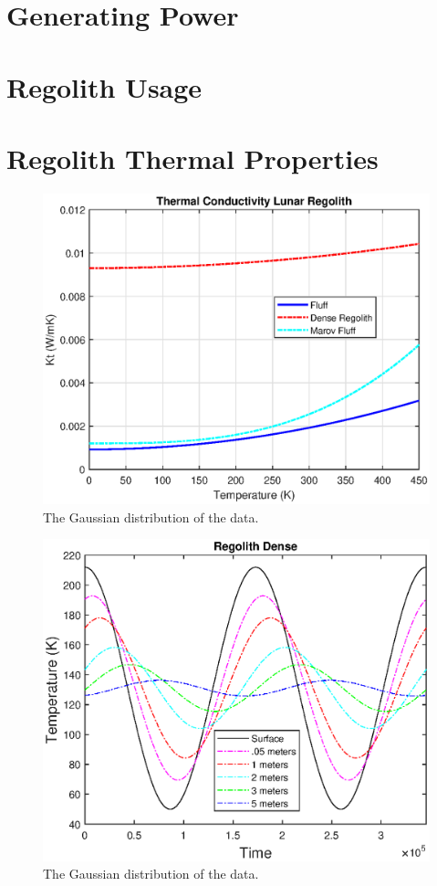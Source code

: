 \documentclass[prl,twocolumn]{revtex4-1}  %
\begin{document}
\section{Generating Power}

\section{Regolith Usage}

\section{Regolith Thermal Properties}


\begin{figure}[!h]
\centering
\includegraphics[width = \linewidth]{thermal_conductivity.eps}
\caption{ The Gaussian distribution of the data. }
\end{figure}


\begin{figure}[!h]
\centering
\includegraphics[width = \linewidth]{Regolith_Pulse.eps}
\caption{ The Gaussian distribution of the data. }
\end{figure}
\end{document}
